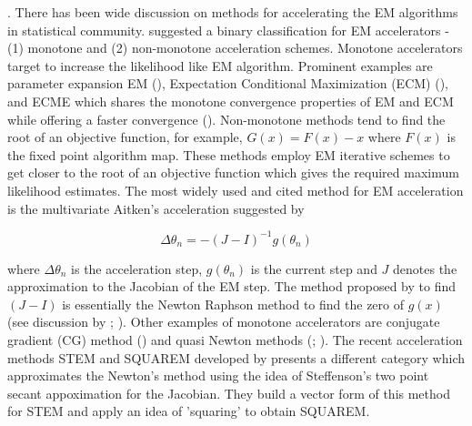 \documentclass[12pt]{article}
\newcommand{\jx}[1]{{\color{blue}{ #1}}}
\begin{document}
\jx{What you have written here has lots of good information. Eventually we may split it up so that some references come in the introduction above, some contextualizes relations to existing work after we present our method, and the rest can become part a more specific background/literature review section to follow the introduction}.
There has been wide discussion on methods for accelerating the EM algorithms in statistical community. \cite{varadhan2008simple} suggested a binary classification for EM accelerators - (1) monotone and (2) non-monotone acceleration schemes. Monotone accelerators target to increase the likelihood like EM algorithm. Prominent examples are parameter expansion EM (\cite{liu1998parameter}), Expectation Conditional Maximization (ECM) (\cite{meng1993maximum}), and ECME which shares the monotone convergence properties of EM and ECM while offering a faster convergence (\cite{liu1994ecme}). Non-monotone methods tend to find the root of an objective function, for example, $G(x) = F(x) - x$ where $F(x)$ is the fixed point algorithm map. These methods employ EM iterative schemes to get closer to the root of an objective function which gives the required maximum likelihood estimates. The most widely used and cited method for EM acceleration is the multivariate Aitken's acceleration suggested by \cite{louis1982finding}

\begin{equation}
    \Delta\theta_n = -(J - I)^{-1}g(\theta_n)
\end{equation}

where $\Delta \theta_n$ is the acceleration step, $g(\theta_n)$ is the current step and $J$ denotes the approximation to the Jacobian of the EM step. The method proposed by \cite{louis1982finding} to find $(J - I)$ is essentially the Newton Raphson method to find the zero of $g(x)$ (see discussion by \cite{laird1987maximum}; \cite{meilijson1989fast}). Other examples of monotone accelerators are conjugate gradient (CG) method (\cite{jamshidian1993conjugate}) and quasi Newton methods (\cite{jamshidian1997acceleration}; \cite{lange1995quasi}). The recent acceleration methods STEM and SQUAREM developed by \cite{varadhan2008simple} presents a different category which approximates the Newton's method using the idea of Steffenson's two point secant appoximation for the Jacobian. They build a vector form of this method for STEM and apply an idea of 'squaring' to obtain SQUAREM. \\
\end{document}
